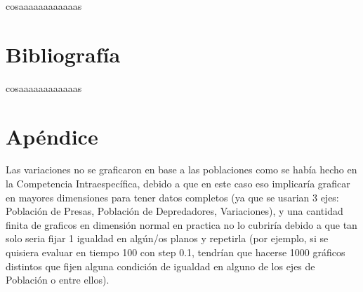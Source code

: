 \documentclass{article}
\begin{document}
\noindent cosaaaaaaaaaaaas



\label{LastPage}


\section*{Bibliografía}

\noindent cosaaaaaaaaaaaas


\section*{Apéndice}






Las variaciones no se graficaron en base a las poblaciones como se había hecho en la Competencia Intraespecífica, debido a que en este caso eso implicaría graficar en mayores dimensiones para tener datos completos (ya que se usarian 3 ejes: Población de Presas, Población de Depredadores, Variaciones), y una cantidad finita de graficos en dimensión normal en practica no lo cubriría debido a que tan solo seria fijar 1 igualdad en algún/os planos y repetirla (por ejemplo, si se quisiera evaluar en tiempo 100 con step 0.1, tendrían que hacerse 1000 gráficos distintos que fijen alguna condición de igualdad en alguno de los ejes de Población o entre ellos). 
\end{document}
